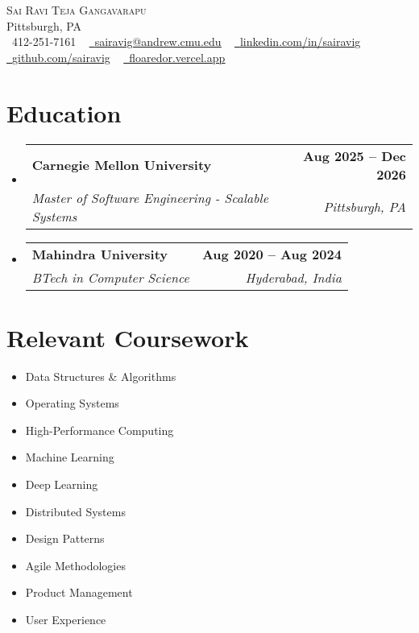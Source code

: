 \documentclass[letterpaper,11pt]{article}
\makeatletter
\newcommand{\resumeSubheading}[4]{
  \vspace{-2pt}\item
    \begin{tabular*}{1.0\textwidth}[t]{l@{\extracolsep{\fill}}r}
      \textbf{#1} & \textbf{\small #2} \\
      \textit{\small#3} & \textit{\small #4} \\
    \end{tabular*}\vspace{-7pt}
}
\newcommand{\resumeSubHeadingListStart}{\begin{itemize}[leftmargin=0.0in, label={}]}
\newcommand{\resumeSubHeadingListEnd}{\end{itemize}}
\makeatother
\begin{document}
\begin{center}
    {\Huge \scshape Sai Ravi Teja Gangavarapu} \\ \vspace{1pt}
    Pittsburgh, PA \\ \vspace{1pt}
    \small \raisebox{-0.1\height}\faPhone\ 412-251-7161 ~ \href{mailto:sairavig@andrew.cmu.edu}{\raisebox{-0.2\height}\faEnvelope\  \underline{sairavig@andrew.cmu.edu}} ~
    \href{https://linkedin.com/in/sairavig}{\raisebox{-0.2\height}\faLinkedin\ \underline{linkedin.com/in/sairavig}}  ~
    \href{https://github.com/sairavig}{\raisebox{-0.2\height}\faGithub\ \underline{github.com/sairavig}} ~
    \href{https://floaredor.vercel.app}{\raisebox{-0.2\height}\faGlobe\ \underline{floaredor.vercel.app}}
    \vspace{-8pt}
\end{center}


\section{Education}
  \resumeSubHeadingListStart
    \resumeSubheading
      {Carnegie Mellon University}{Aug 2025 -- Dec 2026}
      {Master of Software Engineering - Scalable Systems}{Pittsburgh, PA}
    \resumeSubheading
      {Mahindra University}{Aug 2020 -- Aug 2024}
      {BTech in Computer Science}{Hyderabad, India}
  \resumeSubHeadingListEnd

\section{Relevant Coursework}
    \begin{multicols}{4}
        \begin{itemize}[itemsep=-5pt, parsep=3pt]
            \item\small Data Structures \& Algorithms
            \item\small Operating Systems
            \item\small High-Performance Computing
            \item\small Machine Learning
            \item\small Deep Learning
            \item\small Distributed Systems
            \item\small Design Patterns
            \item\small Agile Methodologies
            \item\small Product Management
            \item\small User Experience
        \end{itemize}
    \end{multicols}
    \vspace*{2.0\multicolsep}
\end{document}
